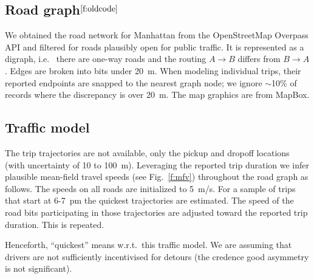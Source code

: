 \documentclass[12pt,notitlepage]{article}
\begin{document}
\subsection{Road graph${}^{\ref{f:oldcode}}$} 
\label{s:graph}



We obtained the road network for Manhattan
%
from the OpenStreetMap Overpass API
and filtered for roads plausibly open for public traffic.
%
%
It is represented as a digraph,
i.e.~%
there are one-way roads 
and
the routing $A \to B$ differs from $B \to A$.
%
Edges are broken into bits under \SI{20}{m}.
%
%
When modeling individual trips,
their reported endpoints
are snapped to the nearest graph node;
we ignore $\sim$10\% of records
where the discrepancy is over \SI{20}{m}.
%
%
%
%
The map graphics are from MapBox.



\subsection{Traffic model} \label{s:traffic}

The trip trajectories are not available,
only the pickup and dropoff locations
(with uncertainty of 10 to \SI{100}{m}).
%
%
Leveraging the reported trip duration 
we infer plausible mean-field travel speeds
(see Fig.~\ref{f:mfv})
throughout the road graph as follows.
%
The speeds on all roads are initialized to \SI{5}{m/s}.
%
For a sample of trips that start at 6-7~pm
the quickest trajectories are estimated.
%
The speed of the road bits participating in those trajectories
are adjusted toward the reported trip duration.
%
This is repeated.
%
%

%

Henceforth, ``quickest''
means
w.r.t.~this traffic model.
%
%
We are assuming that drivers
are not sufficiently incentivised for detours
(the credence good asymmetry is not significant).
\end{document}
